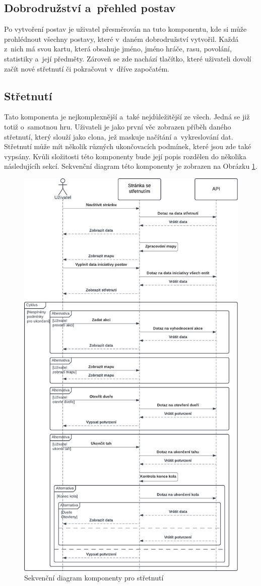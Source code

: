 \subsection{Dobrodružství a~přehled postav}
Po vytvoření postav je uživatel přesměrován na tuto komponentu, kde si může prohlédnout všechny postavy, které v~daném dobrodružství vytvořil. Každá z~nich má svou kartu, která obsahuje jméno, jméno hráče, rasu, povolání, statistiky a~její předměty. Zároveň se zde nachází tlačítko, které uživateli dovolí začít nové střetnutí či pokračovat v~dříve započatém.

\subsection{Střetnutí}
Tato komponenta je nejkomplexnější a~také nejdůležitější ze všech. Jedná se již totiž o~samotnou hru. Uživateli je jako první věc zobrazen příběh daného střetnutí, který slouží jako clona, jež maskuje načítání a~vykreslování dat. Střetnutí může mít několik různých ukončovacích podmínek, které jsou zde také vypsány. Kvůli složitosti této komponenty bude její popis rozdělen do několika následujícíh sekcí. Sekvenční diagram této komponenty je zobrazen na Obrázku \ref{fig:encounter_diagram}.

\begin{figure}[htbp]
  \centering
  \includegraphics[width=.70\textwidth]{resources/figures/encounter_diagram.pdf}
  \caption{Sekvenční diagram komponenty pro střetnutí}
  \label{fig:encounter_diagram}
\end{figure}

